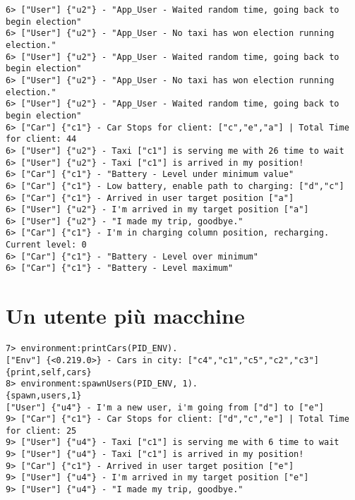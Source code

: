 \begin{lstlisting}
6> ["User"] {"u2"} - "App_User - Waited random time, going back to begin election"
6> ["User"] {"u2"} - "App_User - No taxi has won election running election."
6> ["User"] {"u2"} - "App_User - Waited random time, going back to begin election"
6> ["User"] {"u2"} - "App_User - No taxi has won election running election."
6> ["User"] {"u2"} - "App_User - Waited random time, going back to begin election"
6> ["Car"] {"c1"} - Car Stops for client: ["c","e","a"] | Total Time for client: 44
6> ["User"] {"u2"} - Taxi ["c1"] is serving me with 26 time to wait
6> ["User"] {"u2"} - Taxi ["c1"] is arrived in my position!
6> ["Car"] {"c1"} - "Battery - Level under minimum value"
6> ["Car"] {"c1"} - Low battery, enable path to charging: ["d","c"]
6> ["Car"] {"c1"} - Arrived in user target position ["a"]
6> ["User"] {"u2"} - I'm arrived in my target position ["a"]
6> ["User"] {"u2"} - "I made my trip, goodbye."
6> ["Car"] {"c1"} - I'm in charging column position, recharging. Current level: 0
6> ["Car"] {"c1"} - "Battery - Level over minimum"
6> ["Car"] {"c1"} - "Battery - Level maximum"
\end{lstlisting}

\section{Un utente più macchine}\label{log_one_user_more_cars}
\begin{lstlisting}
7> environment:printCars(PID_ENV).
["Env"] {<0.219.0>} - Cars in city: ["c4","c1","c5","c2","c3"]
{print,self,cars}
8> environment:spawnUsers(PID_ENV, 1).
{spawn,users,1}
["User"] {"u4"} - I'm a new user, i'm going from ["d"] to ["e"]
9> ["Car"] {"c1"} - Car Stops for client: ["d","c","e"] | Total Time for client: 25
9> ["User"] {"u4"} - Taxi ["c1"] is serving me with 6 time to wait
9> ["User"] {"u4"} - Taxi ["c1"] is arrived in my position!
9> ["Car"] {"c1"} - Arrived in user target position ["e"]
9> ["User"] {"u4"} - I'm arrived in my target position ["e"]
9> ["User"] {"u4"} - "I made my trip, goodbye."
\end{lstlisting}

